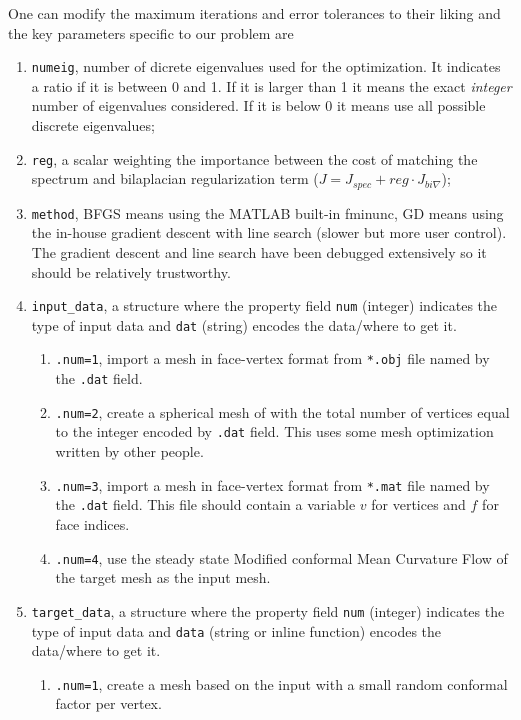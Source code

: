 \documentclass[11pt]{article}
\theoremstyle{definition}
\begin{document}
One can modify the maximum iterations and error tolerances to their liking and the key parameters specific to our problem are
\begin{enumerate}
	\item \verb|numeig|, number of dicrete eigenvalues used for the optimization. It indicates a ratio if it is between 0 and 1. If it is larger than 1 it means the exact \textit{integer} number of eigenvalues considered. If it is below 0 it means use all possible discrete eigenvalues;
	
	\item \verb|reg|, a scalar weighting the importance between the cost of matching the spectrum and bilaplacian regularization term ($J = J_{spec}+ reg \cdot J_{bi\nabla}$);
	
	\item \verb|method|, BFGS means using the MATLAB built-in fminunc, GD means using the in-house gradient descent with line search (slower but more user control). The gradient descent and line search have been debugged extensively so it should be relatively trustworthy.
	
	\item \verb|input_data|, a structure where the property field \verb|num| (integer) indicates the type of input data and \verb|dat| (string) encodes the data/where to get it.
	\begin{enumerate}
		\item \verb|.num=1|, import a mesh in face-vertex format from \verb|*.obj| file named by the \verb|.dat| field.
		
		\item \verb|.num=2|, create a spherical mesh of with the total number of vertices equal to the integer encoded by \verb|.dat| field. This uses some mesh optimization written by other people.
		
		\item \verb|.num=3|, import a mesh in face-vertex format from \verb|*.mat| file named by the \verb|.dat| field. This file should contain a variable $v$ for vertices and $f$ for face indices.
		
		\item \verb|.num=4|, use the steady state Modified conformal Mean Curvature Flow of the target mesh as the input mesh.
		
	\end{enumerate}
	
	\item \verb|target_data|, a structure where the property field \verb|num| (integer) indicates the type of input data and \verb|data| (string or inline function) encodes the data/where to get it.
	\begin{enumerate}
		\item \verb|.num=1|, create a mesh based on the input with a small random conformal factor per vertex.
		

\end{enumerate}
\end{enumerate}
\end{document}
